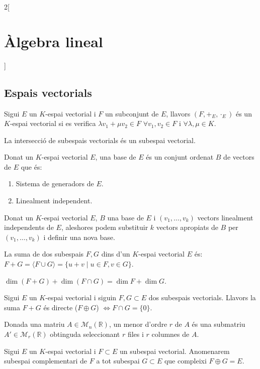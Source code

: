 \documentclass[class=article,10pt,crop=false]{standalone}
\begin{document}
\begin{multicols}{2}[\section{Àlgebra lineal}]
\subsection{Espais vectorials}
\begin{definition}
Sigui $E$ un $K$-espai vectorial i $F$ un subconjunt de $E$, llavors $(F,+_E,\cdot_E)$ és un $K$-espai vectorial si es verifica $\lambda v_1+\mu v_2\in F$ $\forall v_1,v_2\in F$ i $\forall\lambda,\mu\in K$.
\end{definition}
\begin{lemma}
La intersecció de subespais vectorials és un subespai vectorial.
\end{lemma}
\begin{definition}
Donat un $K$-espai vectorial $E$, una base de $E$ és un conjunt ordenat $B$ de vectors de $E$ que és: 
\begin{enumerate}
    \item Sistema de generadors de $E$.
    \item Linealment independent.
\end{enumerate}
\end{definition}
\begin{theorem}
Donat un $K$-espai vectorial $E$, $B$ una base de $E$ i $(v_1,\ldots,v_k)$ vectors linealment independents de $E$, aleshores podem substituir $k$ vectors apropiats de $B$ per $(v_1,\ldots,v_k)$ i definir una nova base.
\end{theorem}
\begin{definition}
La suma de dos subespais $F,G$ dins d'un $K$-espai vectorial $E$ és: $F+G=\langle F\cup G\rangle=\{u+v\mid u\in F,v\in G\}$.
\end{definition}
\begin{prop}
$\dim (F+G)+\dim(F\cap G)=\dim F+\dim G$.
\end{prop}
\begin{definition}
Sigui $E$ un $K$-espai vectorial i siguin $F,G\subset E$ dos subespais vectorials. Llavors la suma $F+G$ és directe ($F\oplus G$) $\iff F\cap G=\{0\}$.
\end{definition}
\begin{definition}
Donada una matriu $A\in\mathcal{M}_n(\mathbb{R})$, un menor d'ordre $r$ de $A$ és una submatriu $A'\in\mathcal{M}_r(\mathbb{R})$ obtinguda seleccionant $r$ files i $r$ columnes de $A$.
\end{definition}
\begin{definition}
Sigui $E$ un $K$-espai vectorial i $F\subset E$ un subespai vectorial. Anomenarem subespai complementari de $F$ a tot subespai $G\subset E$ que compleixi $F\oplus G=E$.

\end{definition}
\end{multicols}
\end{document}
